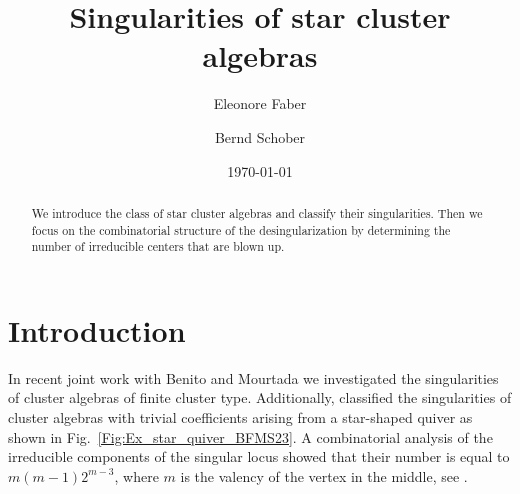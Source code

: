 \documentclass[letter,11pt]{amsart}
\title{Singularities of star cluster algebras}
\author{Eleonore Faber}
\author{Bernd Schober}
\date{\today}
\theoremstyle{theorem}
\theoremstyle{definition}
\numberwithin{equation}{section}
\begin{document}
\maketitle


\begin{abstract}
	We introduce the class of star cluster algebras and classify their singularities. 
	Then we focus on the combinatorial structure of the desingularization by determining the number of irreducible centers that are blown up.
\end{abstract}



\section{Introduction}



In recent joint work with Benito and Mourtada \cite{BFMS23,BFMS25} we investigated the singularities of cluster algebras of finite cluster type. 
Additionally, \cite[Sec.~6]{BFMS23} classified the singularities of cluster algebras with trivial coefficients arising from a star-shaped quiver as shown in Fig.~\ref{Fig:Ex_star_quiver_BFMS23}.
A combinatorial analysis of the irreducible components of the singular locus showed that their 
number is equal to $ m (m-1) 2^{m-3} $, where $ m $ is the valency of the vertex in the middle, see \cite[Thm.~6.3 and Remark~6.5]{BFMS23}. 
\end{document}
